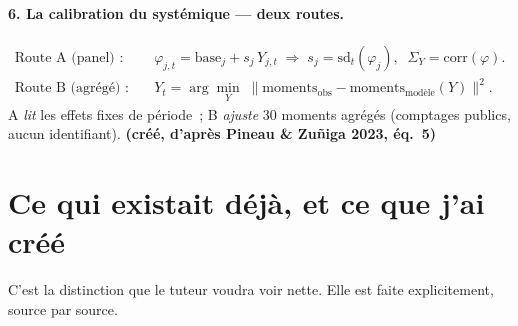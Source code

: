 \documentclass[11pt,a4paper]{article}
\newcommand{\Y}{Y}
\begin{document}
\paragraph{6. La calibration du systémique --- deux routes.}
\begin{align}
\text{Route A (panel) :}\quad & \varphi_{j,t} = \text{base}_j + s_j\,\Y_{j,t}
  \;\Rightarrow\; s_j = \mathrm{sd}_t(\varphi_j),\;\; \Sigma_Y = \mathrm{corr}(\varphi). \\
\text{Route B (agrégé) :}\quad & \Y_t = \arg\min_{\Y}\;\big\| \text{moments}_{\text{obs}}
  - \text{moments}_{\text{modèle}}(\Y)\big\|^2 .
\end{align}
A \emph{lit} les effets fixes de période~; B \emph{ajuste} 30 moments agrégés (comptages
publics, aucun identifiant). \textbf{(créé, d'après Pineau \& Zuñiga 2023, éq.~5)}

\section{Ce qui existait déjà, et ce que j'ai créé}

C'est la distinction que le tuteur voudra voir nette. Elle est faite explicitement, source par
source.
\end{document}
